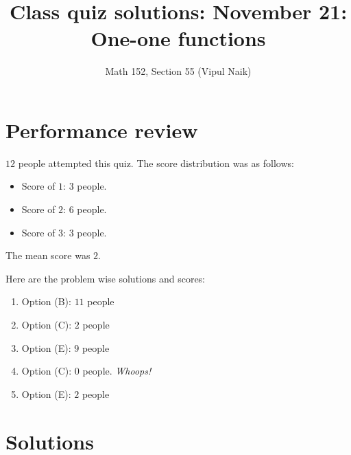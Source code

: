 \documentclass[10pt]{amsart}
\title{Class quiz solutions: November 21: One-one functions}
\author{Math 152, Section 55 (Vipul Naik)}
\begin{document}
\maketitle

\section{Performance review}

$12$ people attempted this quiz. The score distribution was as follows:

\begin{itemize}
\item Score of $1$: $3$ people.
\item Score of $2$: $6$ people.
\item Score of $3$: $3$ people.
\end{itemize}

The mean score was $2$.

Here are the problem wise solutions and scores:

\begin{enumerate}
\item Option (B): $11$ people
\item Option (C): $2$ people
\item Option (E): $9$ people
\item Option (C): $0$ people. {\em Whoops!}
\item Option (E): $2$ people
\end{enumerate}

\section{Solutions}
\end{document}
